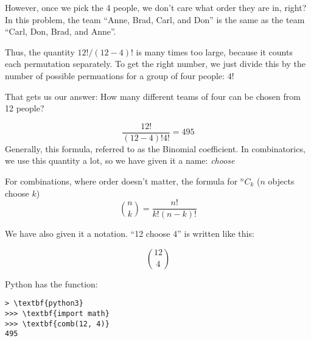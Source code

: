 However, once we pick the 4 people, we don't care what order they are
in, right?  In this problem, the team ``Anne, Brad, Carl, and Don'' is
the same as the team ``Carl, Don, Brad, and Anne''.

Thus, the quantity $12! / (12 - 4)!$ is many times too large, because
it counts each permutation separately. To get the right number, we
just divide this by the number of possible permuations for a group of
four people: $4!$

That gets us our answer: How many different teams of four can be chosen from 12 people?

$$\frac{12!}{(12-4)! 4!}= 495$$
Generally, this formula, referred to as the Binomial coefficient. 
In combinatorics, we use this quantity a lot, so we have given it a name: \textit{choose}
\begin{mdframed}[frametitle = {Combinations}, style = important]
For combinations, where order doesn't matter, the formula for ${}^n C_k$ ($n$ objects choose $k$)
$${n \choose k} = \frac{n!}{k!(n-k)!}$$
\end{mdframed}
We have also given it a notation. ``12 choose 4'' is written like this:

$${12 \choose 4}$$

Python has the  function:

\begin{Verbatim}[commandchars=\\\{\}]
> \textbf{python3}
>>> \textbf{import math}
>>> \textbf{comb(12, 4)}
495  
\end{Verbatim}

